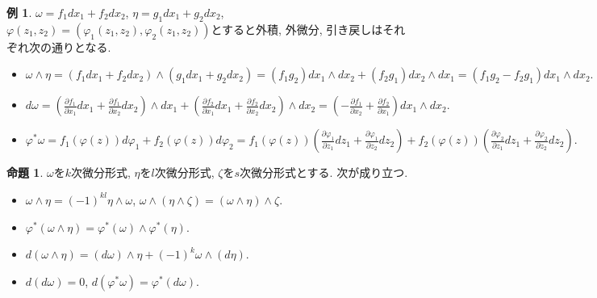 \documentclass[dvipdfmx,a4paper,11pt]{article}
\theoremstyle{definition}
\newtheorem{prop}[thm]{命題}
\newtheorem{exa}[thm]{例}
\newtheorem{rem}[thm]{補足}
\newcommand{\pdrv}[2]{\frac{\partial #1}{\partial #2}}
\begin{document}
 
 \begin{exa}

 $\omega=f_1dx_1+ f_2dx_2$,  $\eta=g_1dx_1+ g_2dx_2$, $\varphi (z_1, z_2) = (\varphi_1(z_1,z_2), \varphi_2(z_1,z_2))$とすると外積, 外微分, 引き戻しはそれぞれ次の通りとなる. 
    \begin{itemize}
    \setlength{\parskip}{0cm}
  \setlength{\itemsep}{2pt} 
\item  $
 \omega \wedge \eta = (f_1dx_1+ f_2dx_2) \wedge (g_1dx_1+ g_2dx_2)
 = (f_1g_2)dx_1 \wedge dx_2 + (f_2g_1)dx_2 \wedge dx_1 = (f_1g_2 - f_2 g_1) dx_1 \wedge dx_2.
 $
\item  $
 d \omega = \left(\pdrv{f_1}{x_1} dx_1+ \pdrv{f_1}{x_2} dx_2\right) \wedge dx_1 + \left(\pdrv{f_2}{x_1} dx_1+ \pdrv{f_2}{x_2} dx_2\right) \wedge dx_2
= \left( -\pdrv{f_1}{x_2} + \pdrv{f_2}{x_1}\right)dx_1 \wedge dx_2.
  $
  \item
  $
 \varphi^{*}\omega
=
 f_{1} (\varphi(z)) d\varphi_{1} +  f_{2} (\varphi(z)) d\varphi_{2}
 =
  f_{1} (\varphi(z)) \left(\pdrv{\varphi_1}{z_1} dz_1 + \pdrv{\varphi_1}{z_2} dz_2 \right) 
  +  f_{2} (\varphi(z)) \left(\pdrv{\varphi_2}{z_1} dz_1 + \pdrv{\varphi_2}{z_2} dz_2 \right). 
$
 \end{itemize}
 
 \end{exa}


  \begin{tcolorbox}[
    colback = white,
    colframe = green!35!black,
    fonttitle = \bfseries,
    breakable = true]
\begin{prop}
$\omega$を$k$次微分形式, $\eta$を$l$次微分形式, $\zeta$を$s$次微分形式とする. 次が成り立つ.
\begin{itemize}
 \setlength{\parskip}{0cm}
  \setlength{\itemsep}{2pt} 
\item$\omega \wedge \eta = (-1)^{kl} \eta \wedge \omega$, $\omega \wedge (\eta  \wedge \zeta)= (\omega \wedge \eta)  \wedge \zeta$. 
\item $\varphi^{*}(\omega \wedge \eta) = \varphi^{*}(\omega) \wedge \varphi^{*}(\eta)$.
\item $d(\omega \wedge \eta ) = (d \omega) \wedge \eta + (-1)^{k}\omega \wedge (d \eta)$.
    \item $d(d \omega)=0$, $d(\varphi^{*}\omega)=\varphi^{*}(d \omega)$.
\end{itemize}
    \end{prop}
    \end{tcolorbox}
  
\end{document}
